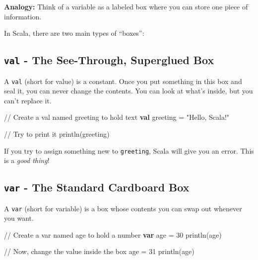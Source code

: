 \documentclass[
  letterpaper,
  DIV=11,
  numbers=noendperiod]{scrreprt}
\newenvironment{Shaded}{\begin{snugshade}}{\end{snugshade}}
\newcommand{\CommentTok}[1]{\textcolor[rgb]{0.37,0.37,0.37}{#1}}
\newcommand{\DecValTok}[1]{\textcolor[rgb]{0.68,0.00,0.00}{#1}}
\newcommand{\FunctionTok}[1]{\textcolor[rgb]{0.28,0.35,0.67}{#1}}
\newcommand{\KeywordTok}[1]{\textcolor[rgb]{0.00,0.23,0.31}{\textbf{#1}}}
\newcommand{\NormalTok}[1]{\textcolor[rgb]{0.00,0.23,0.31}{#1}}
\newcommand{\OperatorTok}[1]{\textcolor[rgb]{0.37,0.37,0.37}{#1}}
\newcommand{\StringTok}[1]{\textcolor[rgb]{0.13,0.47,0.30}{#1}}
\begin{document}
\textbf{Analogy:} Think of a variable as a labeled box where you can
store one piece of information.

In Scala, there are two main types of ``boxes'':

\subsection{\texorpdfstring{\texttt{val} - The See-Through, Superglued
Box}{val - The See-Through, Superglued Box}}\label{val---the-see-through-superglued-box}

A \texttt{val} (short for value) is a constant. Once you put something
in this box and seal it, you can never change the contents. You can look
at what's inside, but you can't replace it.

\begin{Shaded}
\begin{Highlighting}[]
\CommentTok{// Create a \textquotesingle{}val\textquotesingle{} named \textquotesingle{}greeting\textquotesingle{} to hold text}
\KeywordTok{val}\NormalTok{ greeting }\OperatorTok{=} \StringTok{"Hello, Scala!"}

\CommentTok{// Try to print it}
\FunctionTok{println}\OperatorTok{(}\NormalTok{greeting}\OperatorTok{)}
\end{Highlighting}
\end{Shaded}

If you try to assign something new to \texttt{greeting}, Scala will give
you an error. This is a \emph{good thing}!

\subsection{\texorpdfstring{\texttt{var} - The Standard Cardboard
Box}{var - The Standard Cardboard Box}}\label{var---the-standard-cardboard-box}

A \texttt{var} (short for variable) is a box whose contents you can swap
out whenever you want.

\begin{Shaded}
\begin{Highlighting}[]
\CommentTok{// Create a \textquotesingle{}var\textquotesingle{} named \textquotesingle{}age\textquotesingle{} to hold a number}
\KeywordTok{var}\NormalTok{ age }\OperatorTok{=} \DecValTok{30}
\FunctionTok{println}\OperatorTok{(}\NormalTok{age}\OperatorTok{)}

\CommentTok{// Now, change the value inside the box}
\NormalTok{age }\OperatorTok{=} \DecValTok{31}
\FunctionTok{println}\OperatorTok{(}\NormalTok{age}\OperatorTok{)}
\end{Highlighting}
\end{Shaded}
\end{document}
